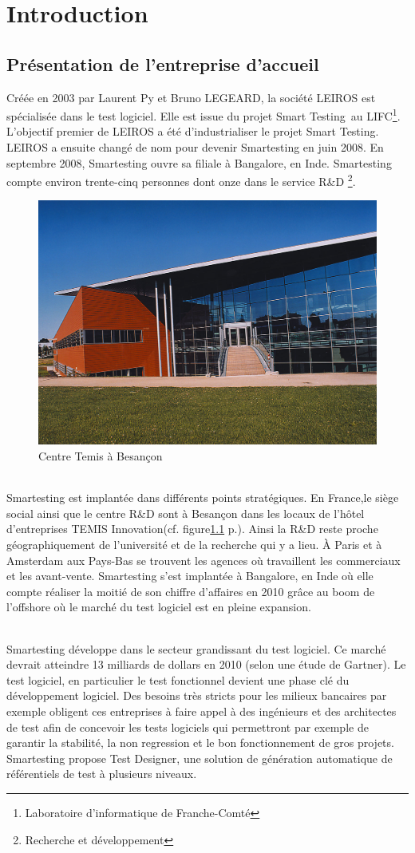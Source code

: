 \chapter{Introduction}

\section{Présentation de l'entreprise d'accueil}
Créée en 2003 par Laurent Py et Bruno LEGEARD, la société LEIROS est spécialisée dans le test logiciel. Elle est issue du projet Smart Testing\texttrademark ~au LIFC\footnote{Laboratoire d'informatique de Franche-Comté}. L'objectif premier de LEIROS a été d'industrialiser le projet Smart Testing\texttrademark.  LEIROS a ensuite changé de nom pour devenir Smartesting en juin 2008. En septembre 2008, Smartesting ouvre sa filiale à Bangalore, en Inde. Smartesting compte environ trente-cinq personnes dont onze dans le service R\&D \footnote{Recherche et développement}.

\begin{figure}[!ht]
\centering
\includegraphics[width=.55\textwidth]{Illustrations/temis.jpg}
\caption{Centre Temis à Besançon}
\label{figure:temis}
\end{figure}

\subparagraph*{}
Smartesting est implantée dans différents points stratégiques. En France,le siège social ainsi que le centre R\&D sont à Besançon dans les locaux de l'hôtel d'entreprises TEMIS Innovation(cf. figure\ref{figure:temis} p.\pageref{figure:temis}). Ainsi la R\&D reste proche géographiquement de l'université et de la recherche qui y a lieu. À Paris et à Amsterdam aux Pays-Bas se trouvent les agences où travaillent les commerciaux et les avant-vente. Smartesting s'est implantée à Bangalore, en Inde où elle compte réaliser la moitié de son chiffre d'affaires en 2010 grâce au boom de l'offshore où le marché du test logiciel est en pleine expansion.

\subparagraph*{}
Smartesting développe dans le secteur grandissant du test logiciel. Ce marché devrait atteindre 13 milliards de dollars en 2010 (selon une étude de Gartner). Le test logiciel, en particulier le test fonctionnel devient une phase clé du développement logiciel. Des besoins très stricts pour les milieux bancaires par exemple obligent ces entreprises à faire appel à des ingénieurs et des architectes de test afin de concevoir les tests logiciels qui permettront par exemple de garantir la stabilité, la non regression et le bon fonctionnement de gros projets. Smartesting propose Test Designer, une solution de génération automatique de référentiels de test à plusieurs niveaux.

